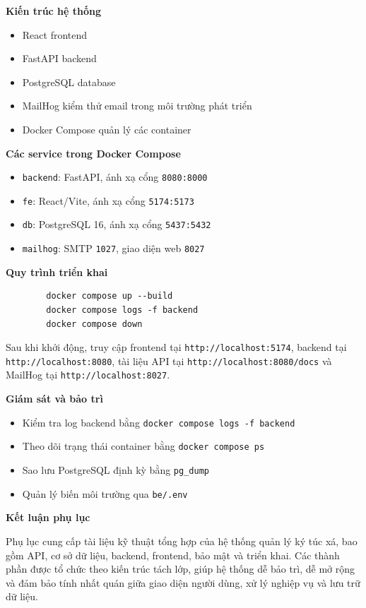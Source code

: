 \documentclass[13pt,a4paper]{extarticle}
\numberwithin{figure}{section}
\numberwithin{table}{section}
\begin{document}
	\noindent
	\textbf{Kiến trúc hệ thống}
	\begin{itemize}
		\item React frontend
		\item FastAPI backend
		\item PostgreSQL database
		\item MailHog kiểm thử email trong môi trường phát triển
		\item Docker Compose quản lý các container
	\end{itemize}
	
	\noindent
	\textbf{Các service trong Docker Compose}
	\begin{itemize}
		\item \texttt{backend}: FastAPI, ánh xạ cổng \texttt{8080:8000}
		\item \texttt{fe}: React/Vite, ánh xạ cổng \texttt{5174:5173}
		\item \texttt{db}: PostgreSQL 16, ánh xạ cổng \texttt{5437:5432}
		\item \texttt{mailhog}: SMTP \texttt{1027}, giao diện web \texttt{8027}
	\end{itemize}
	
	\noindent
	\textbf{Quy trình triển khai}
	
	\begin{lstlisting}
		docker compose up --build
		docker compose logs -f backend
		docker compose down
	\end{lstlisting}
	
	Sau khi khởi động, truy cập frontend tại \texttt{http://localhost:5174}, backend tại \texttt{http://localhost:8080}, tài liệu API tại \texttt{http://localhost:8080/docs} và MailHog tại \texttt{http://localhost:8027}.
	
	\noindent
	\textbf{Giám sát và bảo trì}
	\begin{itemize}
		\item Kiểm tra log backend bằng \texttt{docker compose logs -f backend}
		\item Theo dõi trạng thái container bằng \texttt{docker compose ps}
		\item Sao lưu PostgreSQL định kỳ bằng \texttt{pg\_dump}
		\item Quản lý biến môi trường qua \texttt{be/.env}
	\end{itemize}
	
	\noindent
	\textbf{Kết luận phụ lục}
	
	Phụ lục cung cấp tài liệu kỹ thuật tổng hợp của hệ thống quản lý ký túc xá, bao gồm API, cơ sở dữ liệu, backend, frontend, bảo mật và triển khai. Các thành phần được tổ chức theo kiến trúc tách lớp, giúp hệ thống dễ bảo trì, dễ mở rộng và đảm bảo tính nhất quán giữa giao diện người dùng, xử lý nghiệp vụ và lưu trữ dữ liệu.
\end{document}

